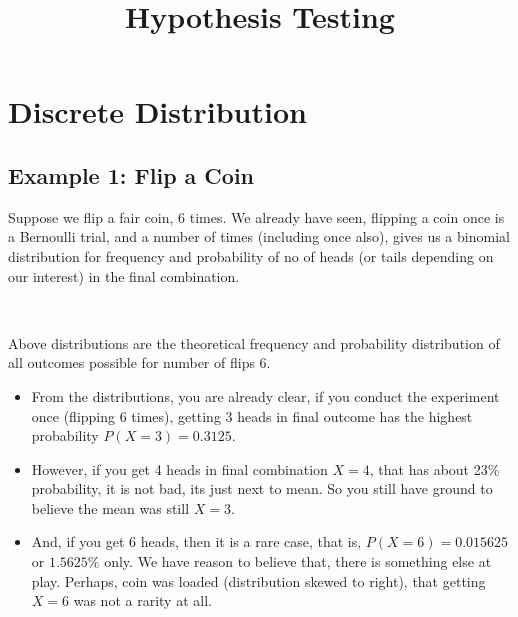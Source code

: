\documentclass[float=false,crop=false]{standalone}
\title{Hypothesis Testing}
\begin{document}
    
    
    \maketitle
    
    

    
    \section{Discrete Distribution}\label{discrete-distribution}
\subsection*{Example 1: Flip a Coin}
    Suppose we flip a fair coin, 6 times. We already have seen, flipping a
coin once is a Bernoulli trial, and a number of times (including once
also), gives us a binomial distribution for frequency and probability of
no of heads (or tails depending on our interest) in the final
combination.
    \begin{center}
    \end{center}
    { \hspace*{\fill} \\}
    
    Above distributions are the theoretical frequency and probability
distribution of all outcomes possible for number of flips 6.

\begin{itemize}
\item
  From the distributions, you are already clear, if you conduct the
  experiment once (flipping 6 times), getting 3 heads in final outcome
  has the highest probability \(P(X=3) = 0.3125\).
\item
  However, if you get 4 heads in final combination \(X=4\), that has
  about 23\% probability, it is not bad, its just next to mean. So you
  still have ground to believe the mean was still \(X=3\).
\item
  And, if you get 6 heads, then it is a rare case, that is,
  \(P(X=6) = 0.015625\) or \(1.5625\%\) only. We have reason to believe
  that, there is something else at play. Perhaps, coin was loaded
  (distribution skewed to right), that getting \(X=6\) was not a rarity
  at all.
\end{itemize}
\end{document}
